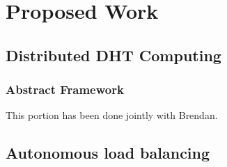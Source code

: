 
\chapter{Proposed Work}

\section{Distributed DHT Computing}

\subsection{Abstract Framework}
This portion has been done jointly with Brendan.


\subsection{}


\section{Autonomous load balancing}

\subsubsection{}
